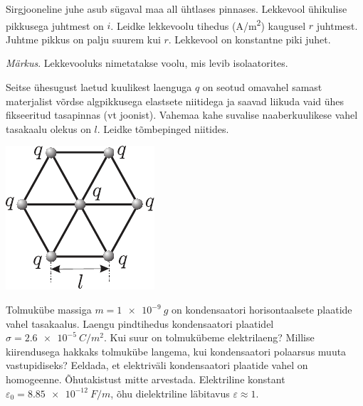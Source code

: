 \documentclass[10pt]{article}
\begin{document}
{%

Sirgjooneline juhe asub sügaval maa all ühtlases pinnases. Lekkevool ühikulise pikkusega juhtmest on $i$. Leidke lekkevoolu tihedus (\si{A/m^2}) kaugusel $r$ juhtmest. Juhtme pikkus on palju suurem kui $r$. Lekkevool on konstantne piki juhet.

\emph{Märkus}. Lekkevooluks nimetatakse voolu, mis levib isolaatorites.
\probend
\bigskip


Seitse ühesugust laetud kuulikest laenguga $q$ on seotud omavahel samast materjalist võrdse algpikkusega elastsete niitidega ja saavad liikuda vaid ühes fikseeritud tasapinnas (vt joonist). Vahemaa kahe suvalise naaberkuulikese vahel tasakaalu olekus on $l$. Leidke tõmbepinged niitides.

\begin{center}
	\includegraphics[width=0.35\linewidth]{2005-lahg-04-yl}
\end{center}
\probend
\bigskip


Tolmukübe massiga $m = \SI{1e-9}{g}$ on kondensaatori horisontaalsete plaatide vahel tasakaalus. Laengu pindtihedus kondensaatori plaatidel $\sigma = \SI{2,6e-5}{C/m^2}$. Kui suur on tolmukübeme elektrilaeng? Millise kiirendusega hakkaks tolmukübe langema, kui kondensaatori polaarsus muuta vastupidiseks? Eeldada, et elektriväli kondensaatori plaatide vahel on homogeenne. Õhutakistust mitte arvestada. Elektriline konstant $\varepsilon_0 = \SI{8,85e-12}{F/m}$, õhu dielektriline läbitavus $\varepsilon \approx 1$.
\probend
\bigskip


}
\end{document}
